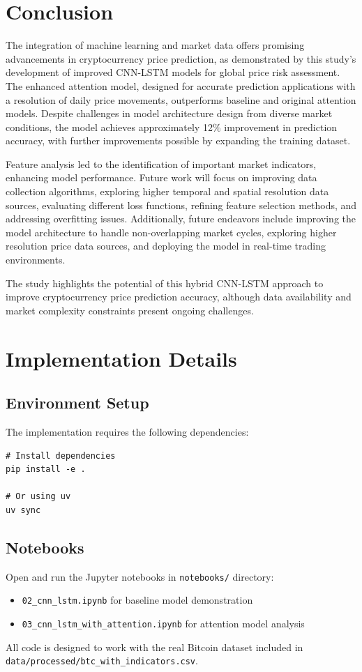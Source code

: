 \documentclass[conference]{IEEEtran}
\begin{document}
\section{Conclusion}

The integration of machine learning and market data offers promising advancements in cryptocurrency price prediction, as demonstrated by this study's development of improved CNN-LSTM models for global price risk assessment. The enhanced attention model, designed for accurate prediction applications with a resolution of daily price movements, outperforms baseline and original attention models. Despite challenges in model architecture design from diverse market conditions, the model achieves approximately 12\% improvement in prediction accuracy, with further improvements possible by expanding the training dataset.

Feature analysis led to the identification of important market indicators, enhancing model performance. Future work will focus on improving data collection algorithms, exploring higher temporal and spatial resolution data sources, evaluating different loss functions, refining feature selection methods, and addressing overfitting issues. Additionally, future endeavors include improving the model architecture to handle non-overlapping market cycles, exploring higher resolution price data sources, and deploying the model in real-time trading environments.

The study highlights the potential of this hybrid CNN-LSTM approach to improve cryptocurrency price prediction accuracy, although data availability and market complexity constraints present ongoing challenges.

\appendix
\section{Implementation Details}

\subsection{Environment Setup}
The implementation requires the following dependencies:
\begin{verbatim}
# Install dependencies
pip install -e .

# Or using uv
uv sync
\end{verbatim}

\subsection{Notebooks}
Open and run the Jupyter notebooks in \texttt{notebooks/} directory:
\begin{itemize}
\item \texttt{02\_cnn\_lstm.ipynb} for baseline model demonstration
\item \texttt{03\_cnn\_lstm\_with\_attention.ipynb} for attention model analysis
\end{itemize}

All code is designed to work with the real Bitcoin dataset included in \texttt{data/processed/btc\_with\_indicators.csv}.
\end{document}
